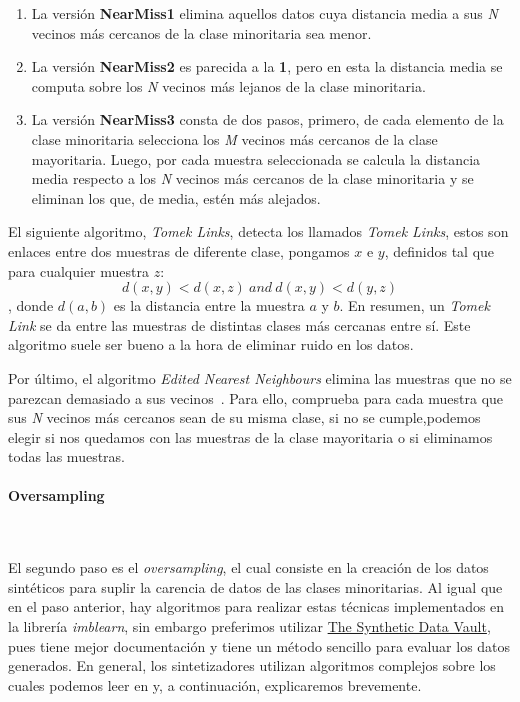 \begin{enumerate}
    \item La versión \textbf{NearMiss1} elimina aquellos datos cuya distancia media a sus \textit{N} vecinos más cercanos de la clase minoritaria sea menor.
    \item La versión \textbf{NearMiss2} es parecida a la \textbf{1}, pero en esta la distancia media se computa sobre los \textit{N} vecinos más lejanos de la clase minoritaria.
    \item La versión \textbf{NearMiss3} consta de dos pasos, primero, de cada elemento de la clase minoritaria selecciona los \textit{M} vecinos más cercanos de la clase mayoritaria. Luego, por cada muestra seleccionada se calcula la distancia media respecto a los \textit{N} vecinos más cercanos de la clase minoritaria y se eliminan los que, de media, estén más alejados.
\end{enumerate}

El siguiente algoritmo, \textit{Tomek Links}, detecta los llamados \textit{Tomek Links}, estos son enlaces entre dos muestras de diferente clase, pongamos \(x\) e \(y\), definidos tal que para cualquier muestra \(z\): 
\[d(x,y) < d(x,z)\ and\ d(x,y) < d(y,z)\], donde \(d(a, b)\) es la distancia entre la muestra \(a\) y \(b\). En resumen, un \textit{Tomek Link} se da entre las muestras de distintas clases más cercanas entre sí. Este algoritmo suele ser bueno a la hora de eliminar ruido en los datos.

Por último, el algoritmo \textit{Edited Nearest Neighbours} elimina las muestras que no se parezcan demasiado a sus vecinos\ \cite{Wil72}. Para ello, comprueba para cada muestra que sus \textit{N} vecinos más cercanos sean de su misma clase, si no se cumple,podemos elegir si nos quedamos con las muestras de la clase mayoritaria o si eliminamos todas las muestras.


\paragraph{Oversampling}\ \label{sec:oversampling}

El segundo paso es el \textit{oversampling}, el cual consiste en la creación de los datos sintéticos para suplir la carencia de datos de las clases minoritarias. Al igual que en el paso anterior, hay algoritmos para realizar estas técnicas implementados en la librería \textit{imblearn}, sin embargo preferimos utilizar \href{https://sdv.dev/}{The Synthetic Data Vault}, pues tiene mejor documentación y tiene un método sencillo para evaluar los datos generados. \cite{Synthesi69:online} En general, los sintetizadores utilizan algoritmos complejos sobre los cuales podemos leer en \cite{Synthesi69:online} y, a continuación, explicaremos brevemente.


